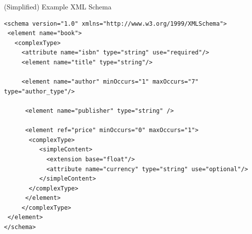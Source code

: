 \begin{frame}[fragile]{(Simplified) Example XML Schema}

\begin{lstlisting}[style=markup,basicstyle=\ttfamily\scriptsize]
<schema version="1.0" xmlns="http://www.w3.org/1999/XMLSchema">
 <element name="book">
   <complexType>
     <attribute name="isbn" type="string" use="required"/>
     <element name="title" type="string"/>
 
     <element name="author" minOccurs="1" maxOccurs="7" type="author_type"/>

      <element name="publisher" type="string" />

      <element ref="price" minOccurs="0" maxOccurs="1">
       <complexType>
          <simpleContent>
            <extension base="float"/>
            <attribute name="currency" type="string" use="optional"/>
          </simpleContent>
       </complexType>
      </element>
     </complexType>
 </element>
</schema>
\end{lstlisting}

\end{frame}